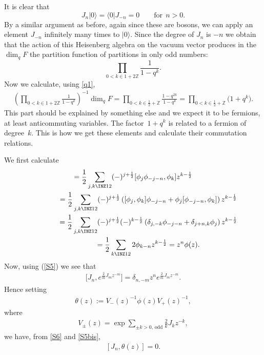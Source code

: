 It is clear that
\[
J_n|0\rangle=\langle 0|J_{-n}=0\qquad\mbox{for}\ \ n>0 .
\]
By a similar argument as before,
again since these are bosons, we can apply an element $J_{-n}$
inf\/initely many times to $|0\rangle$. Since the degree of $J_n$ is $-n$
 we obtain that the action of this Heisenberg algebra on the vacuum
vector produces in the $\dim_q F$ the partition function of partitions in only odd numbers:
\[
\prod_{0< k\in 1+2\mathbb{Z}}\frac{1}{1-q^k}.
\]
Now we calculate, using \eqref{q1},
\begin{gather}
\left(\prod_{0< k\in
1+2\mathbb{Z}}\frac{1}{1-q^k}\right)^{-1}\dim_q F=
\prod_{0< k\in\frac{1}{2}+\mathbb{Z}}\frac{{1-q^{2k}}}{1-q^k}
=\prod_{0< k\in\frac{1}{2}+\mathbb{Z}}\big(1+q^k\big).\label{q3}
\end{gather}
 This part should be explained by something else and we expect it to be
fermions, at least anticommuting variables. The factor~$1+q^k$
is related to a fermion of degree~$k$. This is how we
get these elements and calculate their commutation relations.

We f\/irst calculate
\begin{gather}
  [J_n, \phi(z)] =\frac 12\sum_{j,k\INZ12}(-)^{j+\frac 12}
[\phi_j\phi_{-j-n}, \phi_k]z^{k-\frac 12}\nonumber\\
\hphantom{[J_n, \phi(z)]}{} =\frac{1}{2}\sum_{j,k\INZ12}(-)^{j+\frac 12} \left(
[\phi_j, \phi_k]\phi_{-j-n}+ \phi_j[\phi_{-j-n}, \phi_k]
\right) z^{k-\frac12}\nonumber\\
\hphantom{[J_n, \phi(z)]}{}
=\frac 12\sum_{j,k\INZ12}(-)^{j+\frac 12}
(-)^{k-\frac 12}\left(\delta_{j,-k}\phi_{-j-n}+\delta_{j+n,k}\phi_j\right)
z^{k-\frac 12}\nonumber\\
\hphantom{[J_n, \phi(z)]}{}
=\frac12\sum_{k\INZ12} 2\phi_{k-n}z^{k-\frac 12}
=z^n\phi(z) .\label{S6}
\end{gather}
Now, using (\ref{S5}) we see that
\begin{gather}\label{S5bis}
\big[J_n,e^{\frac2m J_mz^{-m}}\big]=\delta_{n,-m}z^n e^{\frac2m J_mz^{-m}}.
\end{gather}
Hence setting
\begin{gather}\label{theta}
 \theta(z):=V_-(z)^{-1}\phi(z)V_+(z)^{-1},
\end{gather}
where
\begin{gather}
\label{exp}
V_\pm(z)
=\exp\sum_{\pm k>0,\,\mathrm{odd}}\frac{2}{k}J_k z^{-k} ,
\end{gather}
we have, from
\eqref{S6} and \eqref{S5bis},
\begin{gather}\label{comm-Htheta}
[J_n, \theta(z)]=0 .
\end{gather}

